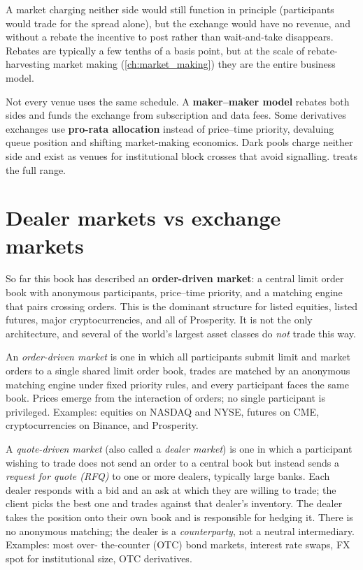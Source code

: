 A market charging neither side would still function in principle
(participants would trade for the spread alone), but the exchange
would have no revenue, and without a rebate the incentive to post
rather than wait-and-take disappears. Rebates are typically a few
tenths of a basis point, but at the scale of rebate-harvesting market
making (\cref{ch:market_making}) they are the entire business model.

Not every venue uses the same schedule. A \textbf{maker--maker model}
rebates both sides and funds the exchange from subscription and data
fees. Some derivatives exchanges use \textbf{pro-rata allocation}
instead of price--time priority, devaluing queue position and
shifting market-making economics. Dark pools charge neither side and
exist as venues for institutional block crosses that avoid signalling.
 treats the full range.

\section{Dealer markets vs exchange markets}
\label{sec:dealer_vs_exchange}

So far this book has described an \textbf{order-driven market}: a
central limit order book with anonymous participants, price--time
priority, and a matching engine that pairs crossing orders. This is
the dominant structure for listed equities, listed futures, major
cryptocurrencies, and all of Prosperity. It is not the only
architecture, and several of the world's largest asset classes do
\emph{not} trade this way.

\begin{definition}
An \emph{order-driven market} is one in which all participants submit
limit and market orders to a single shared limit order book, trades
are matched by an anonymous matching engine under fixed priority
rules, and every participant faces the same book. Prices emerge from
the interaction of orders; no single participant is privileged.
Examples: equities on NASDAQ and NYSE, futures on CME, cryptocurrencies
on Binance, and Prosperity.
\end{definition}

\begin{definition}
A \emph{quote-driven market} (also called a \emph{dealer market}) is
one in which a participant wishing to trade does not send an order to
a central book but instead sends a \emph{request for quote (RFQ)} to
one or more dealers, typically large banks. Each dealer responds with
a bid and an ask at which they are willing to trade; the client picks
the best one and trades against that dealer's inventory. The dealer
takes the position onto their own book and is responsible for
hedging it. There is no anonymous matching; the dealer is a
\emph{counterparty}, not a neutral intermediary. Examples: most over-
the-counter (OTC) bond markets, interest rate swaps, FX spot for
institutional size, OTC derivatives.
\end{definition}

